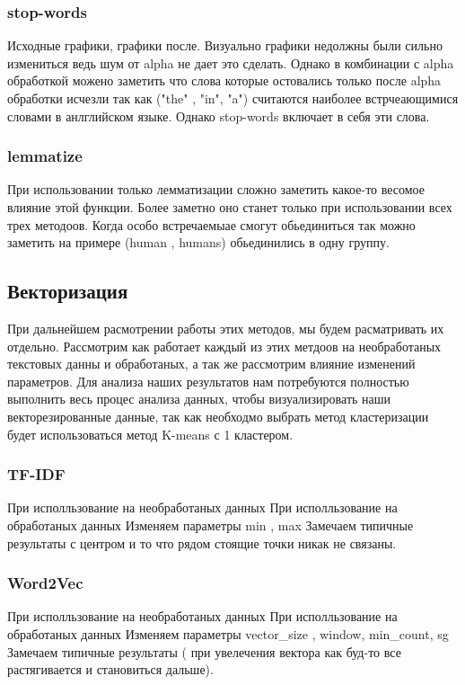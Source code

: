 				
		\subsubsection{stop-words}
			Исходные графики, графики после. Визуально графики недолжны были сильно измениться ведь шум от alpha не дает это сделать. Однако в комбинации с alpha обработкой можено заметить что слова которые остовались только после alpha обработки исчезли так как ("the" , "in", "a") считаются наиболее встрчеающимися словами в анлглийском языке. Однако stop-words включает в себя эти слова.
			
		\subsubsection{lemmatize}
			При использовании только лемматизации сложно заметить какое-то весомое влияние этой функции.
			Более заметно оно станет только при использовании всех трех методоов. Когда особо встречаемыае смогут обьединиться так можно заметить на примере (human , humans) обьединились в одну группу.
			
	\subsection{Векторизация}
		При дальнейшем расмотрении работы этих методов, мы будем расматривать их отдельно. Рассмотрим как работает каждый из этих метдоов на необработаных текстовых данны и обработаных, а так же рассмотрим влияние изменений параметров. Для анализа наших результатов нам потребуются полностью выполнить весь процес анализа данных, чтобы визуализировать наши векторезированные данные, так как необходмо выбрать метод кластеризации будет использоваться метод K-means с 1 кластером.
	
		\subsubsection{TF-IDF}
			При исполльзование на необработаных данных
			При исполльзование на обработаных данных
			Изменяем параметры min , max
			Замечаем типичные результаты с центром и то что рядом стоящие точки никак не связаны.
			
		\subsubsection{Word2Vec}
		 	При исполльзование на необработаных данных
		 	При исполльзование на обработаных данных
		 	Изменяем параметры vector\_size , window, min\_count, sg
		 	Замечаем типичные результаты ( при увелечения вектора как буд-то все растягивается и становиться дальше). 
	
